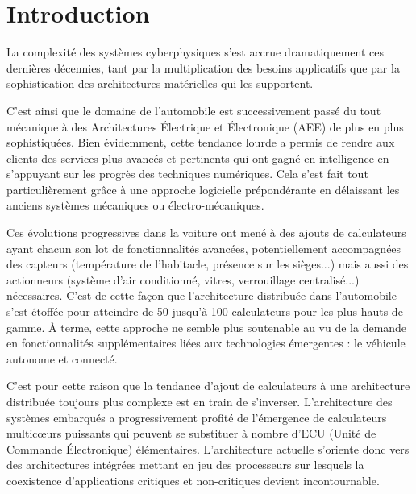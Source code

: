 \documentclass[french, a4paper, 11pt, twoside, pdftex]{StyleThese}
\begin{document}
\fi


\chapter*{Introduction}\label{chap:Introduction}

La complexité des systèmes cyberphysiques s’est accrue dramatiquement  ces dernières décennies, tant par la multiplication des besoins applicatifs que par la sophistication des architectures matérielles qui les supportent.

C'est ainsi que le domaine de l'automobile est successivement passé du tout mécanique à des Architectures Électrique et Électronique (AEE) de plus en plus sophistiquées. Bien évidemment, cette tendance lourde a permis de rendre aux clients des services plus avancés et pertinents qui ont gagné en intelligence en s’appuyant sur les progrès des techniques numériques. Cela s'est fait tout particulièrement grâce à une approche logicielle prépondérante en délaissant les anciens systèmes mécaniques ou électro-mécaniques.

Ces évolutions progressives dans la voiture ont mené à des ajouts de calculateurs ayant chacun son lot de fonctionnalités avancées, potentiellement accompagnées des capteurs (température de l'habitacle, présence sur les sièges...) mais aussi des actionneurs (système d'air conditionné, vitres, verrouillage centralisé...) nécessaires.
C'est de cette façon que l'architecture distribuée dans l'automobile s'est étoffée pour atteindre de 50 jusqu'à 100 calculateurs pour les plus hauts de gamme. À terme, cette approche ne semble plus soutenable au vu de la demande en fonctionnalités supplémentaires liées aux technologies émergentes : le véhicule autonome et connecté.

C’est pour cette raison que la tendance d'ajout de calculateurs à une architecture distribuée toujours plus complexe est en train de s’inverser. L'architecture des systèmes embarqués a progressivement profité de l’émergence de calculateurs multicœurs puissants qui peuvent se substituer à nombre d’ECU (Unité de Commande Électronique) élémentaires. L’architecture actuelle s’oriente donc vers des architectures intégrées mettant en jeu des processeurs sur lesquels la coexistence d’applications critiques et non-critiques devient incontournable. 
\end{document}
